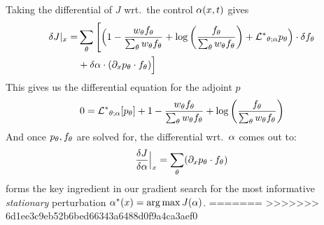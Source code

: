 \documentclass{article}
\begin{document}
Taking the differential of $J$ wrt.\ the control ${\alpha}(x,t)$ gives
\begin{align*}
\delta J|_{x} =&
\sum_{\theta} \Bigg[\Big(
1 - \frac{  w_{\theta} { f_{\theta}} }{\sum_{\theta} w_{\theta}{ f_{\theta}}} 
+ \log\left(\frac{f_{\theta}} {\sum_{\theta} { w_{\theta} } { f_{\theta}} }\right)   
+  { { \mathcal{L} }^* }_{{\theta};{\alpha}} p_{\theta}
\Big)  \cdot { \delta f_{\theta}} 
\\
&+ \delta {\alpha} \cdot ({\partial}_x { p_{\theta}} \cdot { f_{\theta}})
\Big]
\end{align*}
This gives us the differential equation for the adjoint $p$
\begin{equation}
0 = 
{ { \mathcal{L} }^* }_{{\theta};{\alpha}} [p_{\theta}] +  
1 - \frac{  w_{\theta} { f_{\theta}} }{\sum_{\theta} w_{\theta}{ f_{\theta}}} 
+ \log\left(\frac{f_{\theta}} {\sum_{\theta} { w_{\theta} } { f_{\theta}} }\right)   
\end{equation}
And once ${ p_{\theta}}, { f_{\theta}}$ are solved for, the differential wrt.\ ${\alpha}$ comes
out to:
\begin{equation}
\frac {\delta J}{\delta {\alpha}} \Big|_{x} = \sum_{\theta} ({\partial}_x { p_{\theta}} \cdot { f_{\theta}})
\label{eq:differential_objective_stationary_wrt_control_final}
\end{equation}
 forms the key ingredient
in our gradient search for the most informative {\sl stationary} perturbation
$\a^*(x) = \argmax J(\a)$.
=======
>>>>>>> 6d1ee3c9eb52b6bed66343a6488d0f9a4ca3aef0
% 
\end{document}
